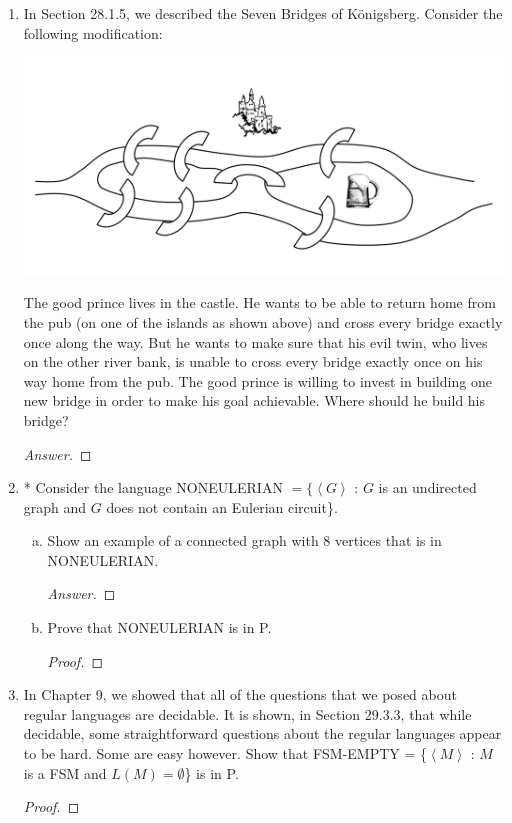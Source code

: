 \documentclass[10pt]{article}
\newcommand{\brackets}[1]{\left< #1 \right>}
\begin{document}
\begin{enumerate}[1)]

\item
In Section 28.1.5, we described the Seven Bridges of Königsberg.  Consider the following modification:\\

\begin{center}
\includegraphics[scale=.25]{images/bridges.png}
\end{center}

The good prince lives in the castle.  He wants to be able to return home from the pub (on one of the islands as
shown above) and cross every bridge exactly once along the way.  But he wants to make sure that his evil twin,
who lives on the other river bank, is unable to cross every bridge exactly once on his way home from the pub.  The
good prince is willing to invest in building one new bridge in order to make his goal achievable.  Where should he
build his bridge?
\begin{proof}[Answer]
\end{proof}


\item
* Consider the language NONEULERIAN $= \{\brackets{G}$ : $G$ is an undirected graph and $G$ does not contain an Eulerian
circuit\}.
\begin{enumerate}[a)]
\item
Show an example of a connected graph with 8 vertices that is in NONEULERIAN.
\begin{proof}[Answer]
\end{proof}
\item
Prove that NONEULERIAN is in P.
\begin{proof}[Proof]
\end{proof}
\end{enumerate}


\item
In Chapter 9, we showed that all of the questions that we posed about regular languages are decidable.  It is shown,
in Section 29.3.3, that while decidable, some straightforward questions about the regular languages appear to be
hard.  Some are easy however.  Show that FSM-EMPTY = \{$\brackets{M}$ : $M$ is a FSM and $L(M) = \emptyset$\} is in P.
\begin{proof}[Proof]
\end{proof}


\end{enumerate}
\end{document}
